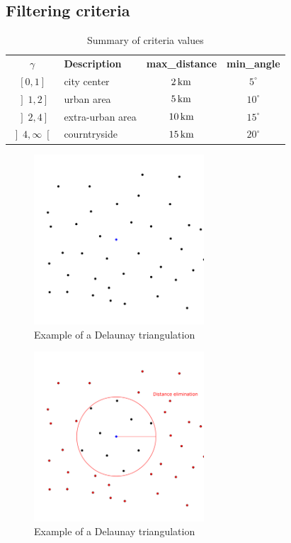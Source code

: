 \documentclass[lettersize,journal,english]{IEEEtran}
\begin{document}
\subsection{Filtering criteria}

\begin{table}[!b]
    \centering
    \caption{Summary of criteria values}
    \label{crit_summary}
    \begin{tabular}{clcc}
        \toprule
        \textbf{$\gamma$} & \textbf{Description} & \textbf{max\_distance} & \textbf{min\_angle} \\
        \cmidrule(lr){1-4}
        $\left[0, 1\right]$ & city center & $\unit[2]{km}$ & $5^\circ$ \\
        $\left]1, 2\right]$ & urban area & $\unit[5]{km}$ & $10^\circ$ \\
        $\left]2, 4\right]$ & extra-urban area & $\unit[10]{km}$ & $15^\circ$ \\
        $\left]4, \infty\right[$ & courntryside & $\unit[15]{km}$ & $20^\circ$ \\
        \bottomrule
    \end{tabular}
\end{table}

\begin{figure}[!t]
    \centering
    \includegraphics[width=2.5in]{images/illus_crit/points.png}
    \caption{Example of a Delaunay triangulation}
    \label{crit_pts}
\end{figure}

\begin{figure}[!b]
    \centering
    \includegraphics[width=2.5in]{images/illus_crit/distance_elim.png}
    \caption{Example of a Delaunay triangulation}
    \label{crit_dis}
\end{figure}
\end{document}
